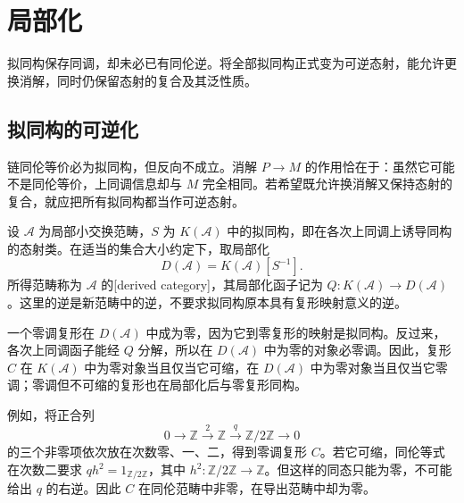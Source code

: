 
\section{局部化}
\label{b4:sec:1701}

拟同构保存同调，却未必已有同伦逆。将全部拟同构正式变为可逆态射，能允许更换消解，同时仍保留态射的复合及其泛性质。


%
%

\subsection{拟同构的可逆化}
\label{b4:subsec:1701:01}

链同伦等价必为拟同构，但反向不成立。消解 \(P\to M\) 的作用恰在于：虽然它可能不是同伦等价，上同调信息却与 \(M\) 完全相同。若希望既允许换消解又保持态射的复合，就应把所有拟同构都当作可逆态射。

\begin{definition}\label{b4:def:derived-category}
	设 \(\mathcal A\) 为局部小交换范畴，\(S\) 为 \(K(\mathcal A)\) 中的拟同构，即在各次上同调上诱导同构的态射类。在适当的集合大小约定下，取局部化
	\[
		D(\mathcal A)=K(\mathcal A)[S^{-1}].
	\]
	所得范畴称为 \(\mathcal A\) 的[derived category]，其局部化函子记为 \(Q:K(\mathcal A)\to D(\mathcal A)\)。这里的逆是新范畴中的逆，不要求拟同构原本具有复形映射意义的逆。
\end{definition}

一个零调复形在 \(D(\mathcal A)\) 中成为零，因为它到零复形的映射是拟同构。反过来，各次上同调函子能经 \(Q\) 分解，所以在 \(D(\mathcal A)\) 中为零的对象必零调。因此，复形 \(C\) 在 \(K(\mathcal A)\) 中为零对象当且仅当它可缩，在 \(D(\mathcal A)\) 中为零对象当且仅当它零调；零调但不可缩的复形也在局部化后与零复形同构。

\ProseParagraphBreak
例如，将正合列
\[
	0\longrightarrow\mathbb Z\xrightarrow{2}\mathbb Z \xrightarrow{q}\mathbb Z/2\mathbb Z\longrightarrow0
\]
的三个非零项依次放在次数零、一、二，得到零调复形 \(C\)。若它可缩，同伦等式在次数二要求 \(q h^2=1_{\mathbb Z/2\mathbb Z}\)，其中 \(h^2:\mathbb Z/2\mathbb Z\to\mathbb Z\)。但这样的同态只能为零，不可能给出 \(q\) 的右逆。因此 \(C\) 在同伦范畴中非零，在导出范畴中却为零。

